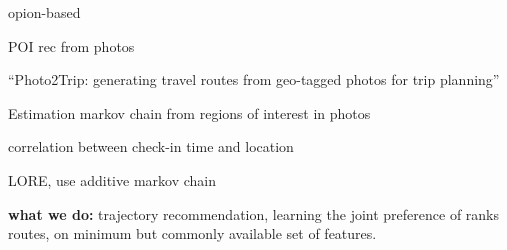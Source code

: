 \cite{Zhang2015OOP} opion-based

POI rec from photos~\cite{shi2011personalized}

``Photo2Trip: generating travel routes from geo-tagged photos for trip planning''~\cite{lu2010photo2trip}

Estimation markov chain from regions of interest in photos~\cite{zheng2012patterns}

correlation between check-in time and location~\cite{gao2013temporal}

LORE, use additive markov chain\cite{zhang2014lore}

{\bf what we do:}
trajectory recommendation, learning the joint preference of ranks routes, on minimum but commonly available set of features. 


